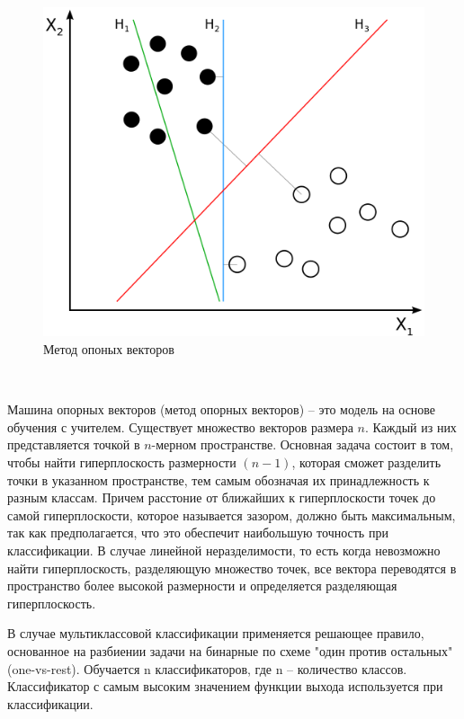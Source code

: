 \

  \begin{figure}[h!]
    \centering
    \setlength{\fboxsep}{5pt}
    \includegraphics[width=.9\textwidth]{img/svm}
    \vspace*{6pt}
    \caption{Метод опоных векторов}\label{fig:project-tree}
  \end{figure}

\

Машина опорных векторов (метод опорных векторов) – это модель на основе обучения с учителем. Существует множество векторов размера $n$. Каждый из них представляется точкой в $n$-мерном пространстве. Основная задача состоит в том, чтобы найти гиперплоскость размерности $(n-1)$, которая сможет разделить точки в указанном пространстве, тем самым обозначая их принадлежность к разным классам. Причем расстоние от ближайших к гиперплоскости точек до самой гиперплоскости, которое называется зазором, должно быть максимальным, так как предполагается, что это обеспечит наибольшую точность при классификации. В случае линейной неразделимости, то есть когда невозможно найти гиперплоскость, разделяющую множество точек, все вектора переводятся в пространство более высокой размерности и определяется разделяющая гиперплоскость.\cite{Vyugin}

В случае мультиклассовой классификации применяется решающее правило, основанное на разбиении задачи на бинарные по схеме "один против остальных" (one-vs-rest). Обучается n классификаторов, где n – количество классов. Классификатор с самым высоким значением функции выхода используется при классификации.


